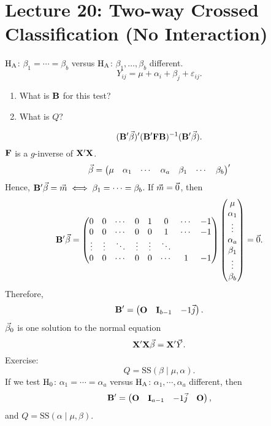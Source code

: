 \section{Lecture 20: Two-way Crossed Classification (No Interaction)}
$ \text{H}_{\text{A}} $: $ \beta_1=\cdots=\beta_b $ versus $ \text{H}_{\text{A}} $:
$ \beta_1,\ldots,\beta_b $ different.
\[ Y_{ij}=\mu+\alpha_i+\beta_j+\varepsilon_{ij}. \]
\begin{enumerate}[(1)]
    \item What is $ \mathbf{B} $ for this test?
    \item What is $ Q $?
\end{enumerate}
\[ (\mathbf{B}'\vec{\beta})'(\mathbf{B}'\mathbf{F}\mathbf{B})^{-1}(\mathbf{B}'\vec{\beta}). \]
$ \mathbf{F} $ is a $ g $-inverse of $ \mathbf{X}'\mathbf{X} $.
\[ \vec{\beta}=\begin{pmatrix}
        \mu & \alpha_1 & \cdots & \alpha_a & \beta_1 & \cdots & \beta_b
    \end{pmatrix}' \]
Hence, $ \mathbf{B}'\vec{\beta}=\vec{m}\iff
    \beta_1=\cdots=\beta_b $. If $ \vec{m}=\vec{0} $, then
\[ \mathbf{B}'\vec{\beta}=\begin{pmatrix}
        0      & 0      & \cdots & 0      & 1      & 0      & \cdots & -1 \\
        0      & 0      & \cdots & 0      & 0      & 1      & \cdots & -1 \\
        \vdots & \vdots & \ddots & \vdots & \vdots & \ddots               \\
        0      & 0      & \cdots & 0      & 0      & \cdots & 1      & -1 \\
    \end{pmatrix}\begin{pmatrix}
        \mu      \\
        \alpha_1 \\
        \vdots   \\
        \alpha_a \\
        \beta_1  \\
        \vdots   \\
        \beta_b
    \end{pmatrix}=\vec{0}. \]
Therefore,
\[ \mathbf{B}'=\begin{pmatrix}
        \mathbf{O} & \mathbf{I}_{b-1} & -1 \vec{j}
    \end{pmatrix}. \]
$ \vec{\beta}_0 $ is one solution to the normal equation
\[ \mathbf{X}'\mathbf{X}\vec{\beta}=\mathbf{X}'\vec{Y}. \]
Exercise:
\[ Q=\text{SS}(\beta\mid \mu,\alpha). \]
If we test $ \text{H}_0 $: $ \alpha_1=\cdots=\alpha_a $
versus $ \text{H}_{\text{A}} $: $ \alpha_1,\cdots,\alpha_a $ different, then
\[ \mathbf{B}'=\begin{pmatrix}
        \mathbf{O} & \mathbf{I}_{a-1} & -1 \vec{j} & \mathbf{O}
    \end{pmatrix}, \]
and $ Q=\text{SS}(\alpha\mid \mu,\beta) $.


